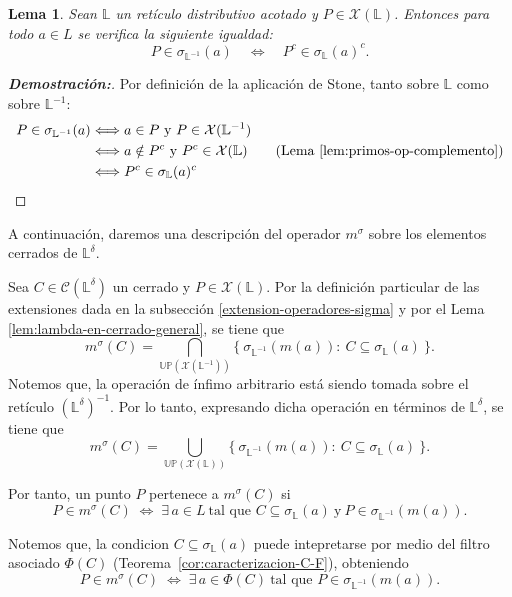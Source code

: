 \documentclass[12pt]{book}
\newtheorem{lemma}[theorem]{Lema}
\newcommand{\Up}{\mathbb{UP}}
\begin{document}
\begin{lemma}\label{lem:equivalencia-sigma-op} Sean $\mathbb L$ un retículo distributivo acotado y
$P\in\mathcal X(\mathbb L)$. Entonces para todo $a\in L$ se verifica la siguiente igualdad:
\[
P\in \sigma_{\mathbb L^{-1}}(a)
\quad\Longleftrightarrow\quad
P^c \in \sigma_{\mathbb L}(a)^c.
\]
\end{lemma}

\begin{proof}[\textbf{Demostración:}]
Por definición de la aplicación de Stone, tanto sobre $\mathbb{L}$ como sobre $\mathbb{L}^{-1}$:
\begin{align*}
P\in\sigma_{\mathbb L^{-1}}(a)
& \Longleftrightarrow a\in P \text{ y } P \in \mathcal{X}(\mathbb L^{-1})\\
& \Longleftrightarrow a\notin P^c \text{ y } P^c \in \mathcal{X}(\mathbb L)\qquad\text{(Lema \ref{lem:primos-op-complemento})}\\
& \Longleftrightarrow P^c\in\sigma_{\mathbb L}(a)^c
\end{align*}
\end{proof}
A continuación, daremos una descripción del operador $m^\sigma$ sobre los elementos cerrados de $\mathbb{L}^{\delta}$.

\vspace{0.2cm}

Sea $C\in\mathcal C(\mathbb L^\delta)$ un cerrado y $P\in\mathcal X(\mathbb L)$. Por la definición particular de las extensiones dada en la subsección \ref{extension-operadores-sigma} y por el Lema \ref{lem:lambda-en-cerrado-general}, se tiene que
\[
m^\sigma(C)=
\bigcap_{\Up(\mathcal X(\mathbb L^{-1}))}
\{\ \sigma_{\mathbb L^{-1}}(m(a)):\ C\subseteq\sigma_{\mathbb L}(a)\ \}.
\]
Notemos que, la operación de ínfimo arbitrario está siendo tomada sobre el retículo $\left(\mathbb{L}^{\delta}\right)^{-1}$. Por lo tanto, expresando dicha operación en términos de $\mathbb{L}^{\delta}$, se tiene que
\[
m^\sigma(C)=
\bigcup_{\Up(\mathcal X(\mathbb L))}
\{\ \sigma_{\mathbb L^{-1}}(m(a)):\ C\subseteq\sigma_{\mathbb L}(a)\ \}.
\]

Por tanto, un punto $P$ pertenece a $m^\sigma(C)$ si
\[
P\in m^\sigma(C)
\;\Longleftrightarrow\;
\exists\,a\in L\ \text{tal que } 
C\subseteq\sigma_{\mathbb L}(a)\ \text{y}\ 
P\in\sigma_{\mathbb L^{-1}}(m(a)).
\]

Notemos que, la condicion $C\subseteq\sigma_{\mathbb L}(a)$ puede intepretarse por medio del filtro asociado $\Phi(C)$ (Teorema~\ref{cor:caracterizacion-C-F}), obteniendo
\[
P\in m^\sigma(C)
\;\Longleftrightarrow\;
\exists\,a\in\Phi(C)\ \text{tal que } 
P\in\sigma_{\mathbb L^{-1}}(m(a)).
\]
\end{document}
